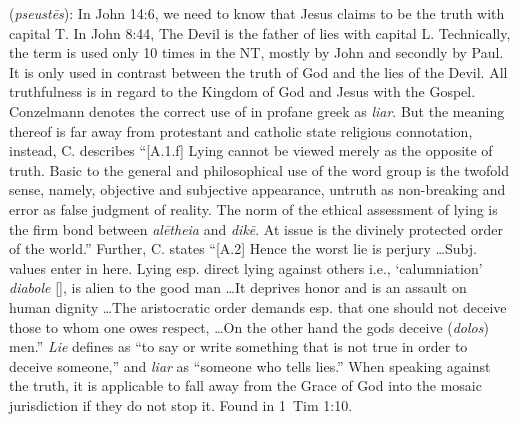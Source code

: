 \item[Liar,]

(\textit{pseustēs}):
In John 14:6, we need to know that Jesus claims to be the truth with capital T. In John 8:44, The Devil is the father of lies with capital L. Technically, the term  is used only 10 times in the NT, mostly by John and secondly by Paul. It is only used in contrast between the truth of God and the lies of the Devil. All truthfulness is in regard to the Kingdom of God and Jesus with the Gospel. 
Conzelmann denotes the correct use of  in profane greek as \emph{liar}. But the meaning thereof is far away from protestant and catholic state religious connotation, instead, C. describes ``[A.1.f] Lying cannot be viewed merely as the opposite of truth. Basic to the general and philosophical use of the word group is the twofold sense, namely, objective and subjective appearance, untruth as non-breaking and error as false judgment of reality. The norm of the ethical assessment of lying is the firm bond between \emph{alētheia} and \emph{dikē}. At issue is the divinely protected order of the world.'' 
Further, C. states ``[A.2] Hence the worst lie is perjury \ldots Subj. values enter in here. Lying esp. direct lying against others i.e., `calumniation' \emph{diabole} [], is alien to the good man \ldots It deprives honor and is an assault on human dignity \ldots The aristocratic order demands esp. that one should not deceive those to whom one owes respect, \ldots On the other hand the gods deceive (\emph{dolos}) men.''
\emph{Lie} defines as ``to say or write something that is not true in order to deceive someone,'' and \emph{liar} as ``someone who tells lies.'' When speaking against the truth, it is applicable to fall away from the Grace of God into the mosaic jurisdiction if they do not stop it.
Found in 1~Tim 1:10.
